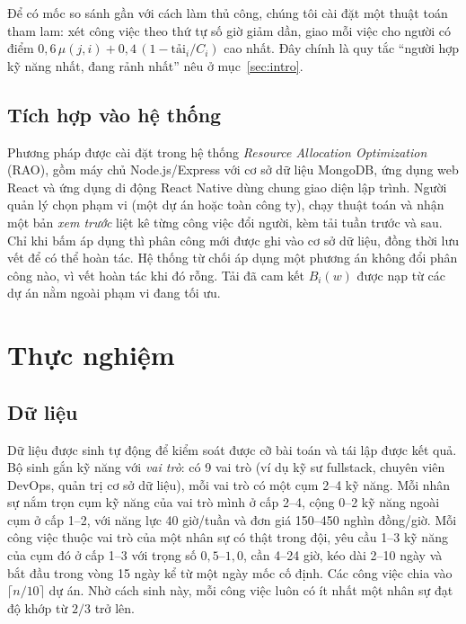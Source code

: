 \documentclass{IEEEtran}
\begin{document}
Để có mốc so sánh gần với cách làm thủ công, chúng tôi cài đặt một thuật toán tham lam: xét công việc theo thứ tự số giờ giảm dần, giao mỗi việc cho người có điểm $0{,}6\,\mu(j,i)+0{,}4\,(1-\text{tải}_i/C_i)$ cao nhất. Đây chính là quy tắc ``người hợp kỹ năng nhất, đang rảnh nhất'' nêu ở mục~\ref{sec:intro}.

\subsection{Tích hợp vào hệ thống}

Phương pháp được cài đặt trong hệ thống \textit{Resource Allocation Optimization} (RAO), gồm máy chủ Node.js/Express với cơ sở dữ liệu MongoDB, ứng dụng web React và ứng dụng di động React Native dùng chung giao diện lập trình. Người quản lý chọn phạm vi (một dự án hoặc toàn công ty), chạy thuật toán và nhận một bản \emph{xem trước} liệt kê từng công việc đổi người, kèm tải tuần trước và sau. Chỉ khi bấm áp dụng thì phân công mới được ghi vào cơ sở dữ liệu, đồng thời lưu vết để có thể hoàn tác. Hệ thống từ chối áp dụng một phương án không đổi phân công nào, vì vết hoàn tác khi đó rỗng. Tải đã cam kết $B_i(w)$ được nạp từ các dự án nằm ngoài phạm vi đang tối ưu.

\section{Thực nghiệm}
\label{sec:exp}

\subsection{Dữ liệu}

Dữ liệu được sinh tự động để kiểm soát được cỡ bài toán và tái lập được kết quả. Bộ sinh gắn kỹ năng với \emph{vai trò}: có 9 vai trò (ví dụ kỹ sư fullstack, chuyên viên DevOps, quản trị cơ sở dữ liệu), mỗi vai trò có một cụm 2--4 kỹ năng. Mỗi nhân sự nắm trọn cụm kỹ năng của vai trò mình ở cấp 2--4, cộng 0--2 kỹ năng ngoài cụm ở cấp 1--2, với năng lực 40 giờ/tuần và đơn giá 150--450 nghìn đồng/giờ. Mỗi công việc thuộc vai trò của một nhân sự có thật trong đội, yêu cầu 1--3 kỹ năng của cụm đó ở cấp 1--3 với trọng số $0{,}5$--$1{,}0$, cần 4--24 giờ, kéo dài 2--10 ngày và bắt đầu trong vòng 15 ngày kể từ một ngày mốc cố định. Các công việc chia vào $\lceil n/10\rceil$ dự án. Nhờ cách sinh này, mỗi công việc luôn có ít nhất một nhân sự đạt độ khớp từ $2/3$ trở lên.
\end{document}
